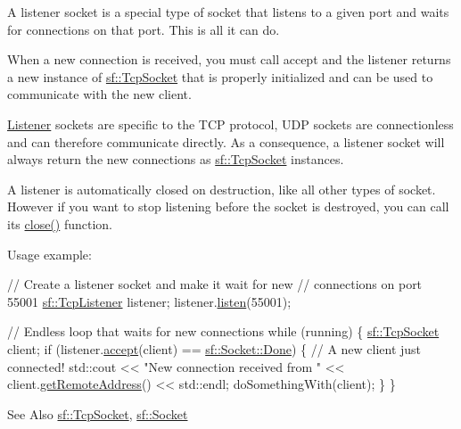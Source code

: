 A listener socket is a special type of socket that listens to a given port and waits for connections on that port. This is all it can do.

When a new connection is received, you must call accept and the listener returns a new instance of \hyperlink{classsf_1_1_tcp_socket}{sf\-::\-Tcp\-Socket} that is properly initialized and can be used to communicate with the new client.

\hyperlink{classsf_1_1_listener}{Listener} sockets are specific to the T\-C\-P protocol, U\-D\-P sockets are connectionless and can therefore communicate directly. As a consequence, a listener socket will always return the new connections as \hyperlink{classsf_1_1_tcp_socket}{sf\-::\-Tcp\-Socket} instances.

A listener is automatically closed on destruction, like all other types of socket. However if you want to stop listening before the socket is destroyed, you can call its \hyperlink{classsf_1_1_tcp_listener_a3a00a850506bd0f9f48867a0fe59556b}{close()} function.

Usage example\-: 
\begin{DoxyCode}
\textcolor{comment}{// Create a listener socket and make it wait for new}
\textcolor{comment}{// connections on port 55001}
\hyperlink{classsf_1_1_tcp_listener}{sf::TcpListener} listener;
listener.\hyperlink{classsf_1_1_tcp_listener_a409d9350d3abfea9636df8cf4a61004e}{listen}(55001);

\textcolor{comment}{// Endless loop that waits for new connections}
\textcolor{keywordflow}{while} (running)
\{
    \hyperlink{classsf_1_1_tcp_socket}{sf::TcpSocket} client;
    \textcolor{keywordflow}{if} (listener.\hyperlink{classsf_1_1_tcp_listener_ae2c83ce5a64d50b68180c46bef0a7346}{accept}(client) == \hyperlink{classsf_1_1_socket_a51bf0fd51057b98a10fbb866246176dca6b3d5ba897b6df8ebda86c823b30348a}{sf::Socket::Done})
    \{
        \textcolor{comment}{// A new client just connected!}
        std::cout << \textcolor{stringliteral}{"New connection received from "} << client.\hyperlink{classsf_1_1_tcp_socket_a7904ca6ab9e018021e305a3aeb7a1b9a}{getRemoteAddress}() << 
      std::endl;
        doSomethingWith(client);
    \}
\}
\end{DoxyCode}


\begin{DoxySeeAlso}{See Also}
\hyperlink{classsf_1_1_tcp_socket}{sf\-::\-Tcp\-Socket}, \hyperlink{classsf_1_1_socket}{sf\-::\-Socket} 
\end{DoxySeeAlso}


